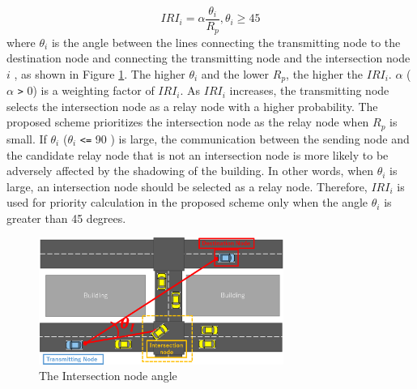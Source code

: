 \documentclass[conference]{IEEEtran}
\begin{document}
\begin{equation}
\label{IRI}
IRI_i =  \alpha\frac{\theta_i}{R_p}, \theta_i \geq 45
\end{equation}
where $\theta_i$ is the angle between the lines connecting the transmitting node to the destination node and  connecting the transmitting node and the intersection node $i$ , as shown in Figure \ref{fig:intersection_angle}.
The higher $\theta_i$  and the lower  $R_p$, the higher the $IRI_i$.
$\alpha$ ($\alpha$ \verb|>| 0) is a weighting factor of $IRI_i$.
As $IRI_i$ increases, the transmitting node selects the intersection node as a relay node with a higher probability. 
The proposed scheme prioritizes the intersection node as the relay node when $R_p$ is small. 
If $\theta_i$ ($\theta_i$ \verb|<=| 90 ) is large, the communication between the sending node and the candidate relay node that is not an intersection node is more likely to be adversely affected by the shadowing of the building. In other words, when $\theta_i$ is large, an intersection node should be selected as a relay node. Therefore, $IRI_i$ is used for priority calculation in the proposed scheme only when the angle $\theta_i$ is greater than 45 degrees.


\begin{figure}[!ht]
\centering
\includegraphics[width=80mm]{figures/Intersection_angle.eps}
\caption{The Intersection node angle}
\label{fig:intersection_angle}
\end{figure}
\end{document}
